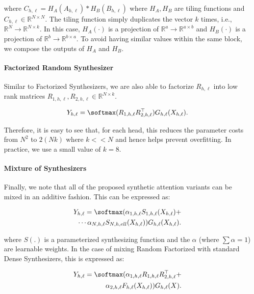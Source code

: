 where $C_{h,\ell}=H_{A}(A_{h,\ell})* H_B(B_{h,\ell})$ where $H_A, H_B$ are tiling functions and $C_{h,\ell} \in \mathbb{R}^{N \times N}$. The tiling function simply duplicates the vector $k$ times, i.e., $\mathbb{R}^{N} \rightarrow \mathbb{R}^{N \times k}$. In this case, $H_A(\cdot)$ is a projection of $\mathbb{R}^{a} \rightarrow \mathbb{R}^{a \times b}$ and $H_B(\cdot)$ is a projection of $\mathbb{R}^{b} \rightarrow \mathbb{R}^{b \times a}$. To avoid having similar values within the same block, we compose the outputs of $H_{A}$ and $H_{B}$.

\paragraph{Factorized Random Synthesizer} Similar to Factorized Synthesizers, we are also able to factorize $R_{h,\ell}$ into low rank matrices $R_{1,h,\ell},R_{2,h,\ell} \in \mathbb{R}^{N \times k}$.

\begin{align}
Y_{h,\ell} = \softmax(R_{1,h,\ell}R_{2,h,\ell}^{\top})G_{h,\ell}(X_{h,\ell}).    
\end{align}

Therefore, it is easy to see that, for each head, this reduces the parameter costs from $N^2$ to $2(N k)$ where $k << N$ and hence helps prevent overfitting. In practice, we use a small value of $k=8$. 

\paragraph{Mixture of Synthesizers} Finally, we note that all of the proposed synthetic attention variants can be mixed in an additive fashion. This can be expressed as:

\begin{align*}
Y_{h,\ell} = \softmax(\alpha_{1,h,\ell} S_{1,h,\ell}(X_{h,\ell})+ \\ 
\cdots \alpha_{N,h,\ell} S_{N,h,ell}(X_{h,\ell}))G_{h,\ell}(X_{h,\ell}).   
\end{align*}

where $S(.)$ is a parameterized synthesizing function and the $\alpha$ (where $\sum \alpha = 1$) are learnable weights. In the case of mixing Random Factorized with standard Dense Synthesizers, this is expressed as:

\begin{align*}
Y_{h,\ell} = \softmax(\alpha_{1,h,\ell} R_{1,h,\ell}R_{2,h,\ell}^{\top}+ \\ \alpha_{2,h,\ell}F_{h,\ell}(X_{h,\ell}))G_{h,\ell}(X).    
\end{align*}

